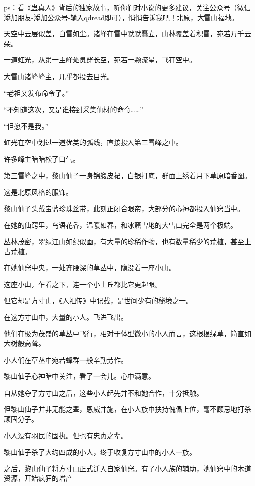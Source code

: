 
\begin{this_body}

ps：看《蛊真人》背后的独家故事，听你们对小说的更多建议，关注公众号（微信添加朋友-添加公众号-输入qdread即可），悄悄告诉我吧！北原，大雪山福地。

天空中云层似盖，白雪如尘。诸峰在雪中默默矗立，山林覆盖着积雪，宛若万千云朵。

一道虹光，从第一主峰处贯穿长空，宛若一颗流星，飞在空中。

大雪山诸峰峰主，几乎都投去目光。

“老祖又发布命令了。”

“不知道这次，又是谁接到采集仙材的命令……”

“但愿不是我。”

虹光在空中划过一道优美的弧线，直接投入第三雪峰之中。

许多峰主暗暗松了口气。

第三雪峰之中，黎山仙子一身锦缎皮裙，白银打底，群面上绣着月下草原暗香图。

这是北原风格的服饰。

黎山仙子头戴宝蓝珍珠丝带，此刻正闭合眼帘，大部分的心神都投入仙窍当中。

在她的仙窍里，鸟语花香，温暖如春，和冰窟雪地的大雪山完全是两个极端。

丛林茂密，翠绿江山如织似画，有大量的珍稀作物，也有数量稀少的荒植，甚至上古荒植。

在她仙窍中央，一处齐腰深的草丛中，隐没着一座小山。

这座小山，乍看之下，连一个小土丘都比它更起眼。

但它却是方寸山，《人祖传》中记载，是世间少有的秘境之一。

在这方寸山中，大量的小人。飞进飞出。

他们在极为茂盛的草丛中飞行，相对于体型微小的小人而言，这根根绿草，简直如大树般高耸。

小人们在草丛中宛若蜂群一般辛勤劳作。

黎山仙子心神暗中关注，看了一会儿。心中满意。

自从她夺了方寸山之后，这些小人起先并不和她合作，十分抵触。

但黎山仙子并非无能之辈，恩威并施，在小人族中扶持傀儡上位，毫不顾忌地打杀顽固分子。

小人没有羽民的固执。但也有忠贞之辈。

黎山仙子杀了大约四成的小人，终于收复方寸山中的小人一族。

之后，黎山仙子将方寸山正式迁入自家仙窍。有了小人族的辅助，她仙窍中的木道资源，开始疯狂的增产！


\end{this_body}
